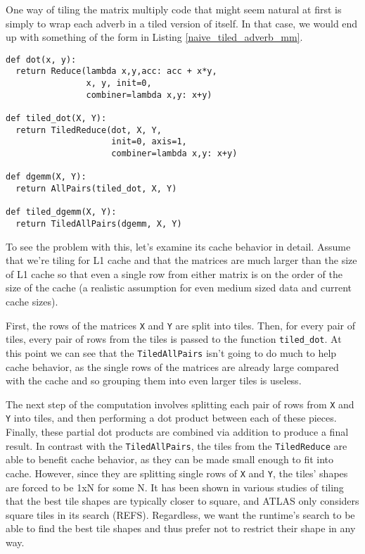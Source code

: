 \documentclass[preprint,9pt]{sigplanconf}
\begin{document}
One way of tiling the matrix multiply code that might seem natural at first is simply to wrap each adverb in a tiled version of itself.  In that case, we would end up with something of the form in Listing \ref{naive_tiled_adverb_mm}.

\begin{lstlisting}[frame=single, label=naive_tiled_adverb_mm, caption={Naively Tiled Matrix Multiply}, belowskip=0.5em]
def dot(x, y):
  return Reduce(lambda x,y,acc: acc + x*y,
                x, y, init=0,
                combiner=lambda x,y: x+y)

def tiled_dot(X, Y):
  return TiledReduce(dot, X, Y,
                     init=0, axis=1,
                     combiner=lambda x,y: x+y)

def dgemm(X, Y):
  return AllPairs(tiled_dot, X, Y)
                     
def tiled_dgemm(X, Y):
  return TiledAllPairs(dgemm, X, Y)
\end{lstlisting}

To see the problem with this, let's examine its cache behavior in detail.  Assume that we're tiling for L1 cache and that the matrices are much larger than the size of L1 cache so that even a single row from either matrix is on the order of the size of the cache (a realistic assumption for even medium sized data and current cache sizes).

First, the rows of the matrices \lstinline{X} and \lstinline{Y} are split into tiles.  Then, for every pair of tiles, every pair of rows from the tiles is passed to the function \lstinline{tiled_dot}.  At this point we can see that the \lstinline{TiledAllPairs} isn't going to do much to help cache behavior, as the single rows of the matrices are already large compared with the cache and so grouping them into even larger tiles is useless.

The next step of the computation involves splitting each pair of rows from \lstinline{X} and \lstinline{Y} into tiles, and then performing a dot product between each of these pieces.  Finally, these partial dot products are combined via addition to produce a final result.  In contrast with the \lstinline{TiledAllPairs}, the tiles from the \lstinline{TiledReduce} are able to benefit cache behavior, as they can be made small enough to fit into cache.  However, since they are splitting single rows of \lstinline{X} and \lstinline{Y}, the tiles' shapes are forced to be 1xN for some N.  It has been shown in various studies of tiling that the best tile shapes are typically closer to square, and ATLAS only considers square tiles in its search (REFS).  Regardless, we want the runtime's search to be able to find the best tile shapes and thus prefer not to restrict their shape in any way.
\end{document}
